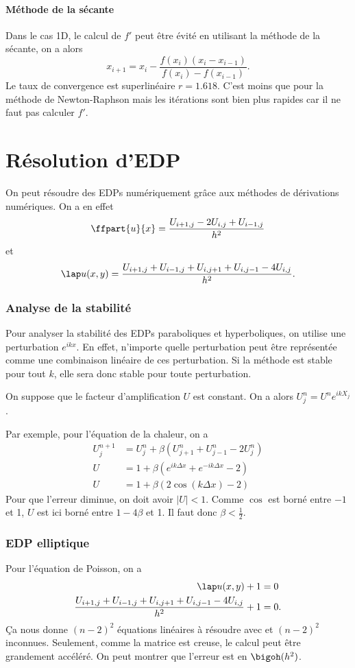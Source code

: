 \subsection{Méthode de la sécante}
Dans le cas 1D,
le calcul de $f'$ peut être évité en utilisant la méthode
de la sécante, on a alors
\[ x_{i+1} = x_i - \frac{f(x_i)(x_i - x_{i-1})}
{f(x_i) - f(x_{i-1})}. \]
Le taux de convergence est superlinéaire $r = 1.618$.
C'est moins que pour la méthode de Newton-Raphson mais les itérations
sont bien plus rapides car il ne faut pas calculer $f'$.

\part{Résolution d'EDP}
On peut résoudre des EDPs numériquement grâce aux méthodes de dérivations
numériques.
On a en effet
\[ \ffpart{u}{x} = \frac{U_{i+1,j} - 2 U_{i,j} + U_{i-1,j}}{h^2} \]
et
\[ \lap u(x, y) =
\frac{U_{i+1,j} + U_{i-1,j} + U_{i,j+1} + U_{i,j-1} -4U_{i,j}}{h^2}. \]

\section{Analyse de la stabilité}
Pour analyser la stabilité des EDPs paraboliques et hyperboliques,
on utilise une perturbation $e^{ikx}$.
En effet, n'importe quelle perturbation peut être représentée
comme une combinaison linéaire de ces perturbation.
Si la méthode est stable pour tout $k$,
elle sera donc stable pour toute perturbation.

On suppose que le facteur d'amplification $U$ est constant.
On a alors $U_j^n = U^n e^{ikX_j}$.

Par exemple, pour l'équation de la chaleur, on a
\begin{align*}
  U_j^{n+1} & = U_j^n + \beta(U_{j+1}^n + U_{j-1}^n - 2U_j^n)\\
  U & = 1 + \beta(e^{ik\Delta x} + e^{-ik\Delta x} - 2)\\
  U & = 1 + \beta(2\cos(k\Delta x) - 2)
\end{align*}
Pour que l'erreur diminue, on doit avoir $|U| < 1$.
Comme $\cos$ est borné entre $-1$ et 1, $U$ est ici borné entre
$1 - 4\beta$ et 1.
Il faut donc $\beta < \frac{1}{2}$.

\section{EDP elliptique}
Pour l'équation de Poisson, on a
\begin{align*}
  \lap u(x, y) + 1 & = 0\\
  \frac{U_{i+1,j} + U_{i-1,j} + U_{i,j+1} + U_{i,j-1} -4U_{i,j}}{h^2}
  + 1 & = 0.
\end{align*}
Ça nous donne $(n-2)^2$ équations linéaires à résoudre avec
et $(n-2)^2$ inconnues.
Seulement, comme la matrice est creuse, le calcul peut être grandement
accéléré.
On peut montrer que l'erreur est en $\bigoh(h^2)$.

